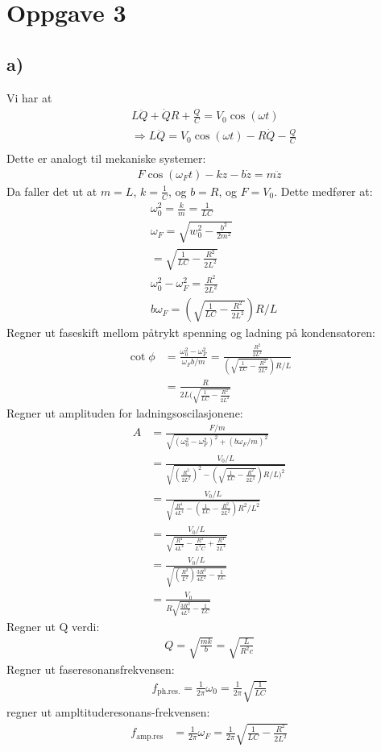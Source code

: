 \documentclass{article}
\newcommand{\opg}[1]{\section*{Oppgave #1}}
\newcommand{\subopg}[1]{\subsection*{#1)}}
\begin{document}
\opg{3}
\subopg{a}
Vi har at
\begin{align*}
    &L \ddot{Q}+ \dot{Q}R + \frac{Q}{C} = V_0\cos(\omega t)\\
    &\Rightarrow L\ddot{Q} = V_0\cos(\omega t)  - R\dot{Q} -\frac{Q}{C}\\
\end{align*}
Dette er analogt til mekaniske systemer:
\begin{align*}
    F\cos (\omega_Ft) - kz -b \dot{z} = m\ddot{z}
\end{align*}
Da faller det ut at $m=L$, $k=\frac{1}{C}$, og $b=R$, og $F=V_0$. Dette medfører at:
\begin{align*}
    &\omega_0^2 =\frac{k}{m} = \frac{1}{LC}\\
    &\omega_F = \sqrt{w_0^2 - \frac{b^2}{2m^2}}\\
    &= \sqrt{\frac{1}{LC} - \frac{R^2}{2L^2}}\\
    &\omega_0^2 - \omega_F^2 =\frac{R^2}{2L^2}\\
    & b\omega_F = (\sqrt{\frac{1}{LC} - \frac{R^2}{2L^2}})R/L
\end{align*}
Regner ut faseskift mellom påtrykt spenning  og ladning på kondensatoren:
\begin{align*}
    \cot \phi  &= \frac{\omega_0^2 - \omega_F^2}{\omega_Fb/m}
    = \frac{\frac{R^2}{2L^2}}{(\sqrt{\frac{1}{LC} - \frac{R^2}{2L^2}})R/L}\\
    &= \frac{R}{2L(\sqrt{\frac{1}{LC} - \frac{R^2}{2L^2}}}
\end{align*}
Regner ut amplituden for ladningsoscilasjonene:
\begin{align*}
    A &= \frac{F/m}{\sqrt{(\omega_0^2 - \omega_F^2)^2 + (b\omega_F/m)^2}}\\
    &= \frac{V_0/L}{\sqrt{(\frac{R^2}{2L^2})^2 - (\sqrt{\frac{1}{LC} - \frac{R^2}{2L^2}})R/L)^2}}\\
    &= \frac{V_0/L}{\sqrt{\frac{R^4}{4L^4} -  (\frac{1}{LC} - \frac{R^2}{2L^2})R^2/L^2}}\\
    &= \frac{V_0/L}{\sqrt{\frac{R^4}{4L^4} -  \frac{R^2}{L^3C} + \frac{R^4}{2L^4}}}\\
    &=  \frac{V_0/L}{\sqrt{(\frac{R^2}{L^2})\frac{3R^2}{4L^2} -  \frac{1}{LC} }}\\
    &=\frac{V_0}{R\sqrt{\frac{3R^2}{4L^2} -  \frac{1}{LC}}}
\end{align*}
Regner ut Q verdi:
\begin{align*}
    Q = \sqrt{\frac{mk}{b}}=\sqrt{\frac{L}{R^2c}}
\end{align*}
Regner ut faseresonansfrekvensen:
\begin{align*}
    f_{\text{ph.res}.} = \frac{1}{2\pi}\omega_0 = \frac{1}{2\pi}\sqrt{\frac{1}{LC}}
\end{align*}
regner ut  ampltituderesonans-frekvensen:
\begin{align*}
    f_{\text{amp.res}} &= \frac{1}{2\pi}\omega_F = \frac{1}{2\pi}\sqrt{\frac{1}{LC} - \frac{R^2}{2L^2}}
\end{align*}
\end{document}
